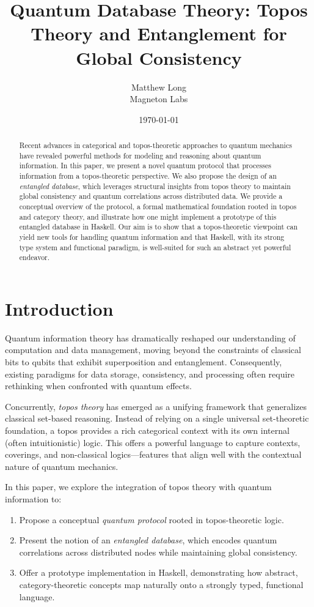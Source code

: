 \documentclass[11pt]{article}
\title{\textbf{Quantum Database Theory: Topos Theory and Entanglement for Global Consistency}}
\author{Matthew Long \\
Magneton Labs}
\date{\today}
\begin{document}
\maketitle

\begin{abstract}
Recent advances in categorical and topos-theoretic approaches to quantum mechanics have revealed powerful methods for modeling and reasoning about quantum information. In this paper, we present a novel quantum protocol that processes information from a topos-theoretic perspective. We also propose the design of an \emph{entangled database}, which leverages structural insights from topos theory to maintain global consistency and quantum correlations across distributed data. We provide a conceptual overview of the protocol, a formal mathematical foundation rooted in topos and category theory, and illustrate how one might implement a prototype of this entangled database in Haskell. Our aim is to show that a topos-theoretic viewpoint can yield new tools for handling quantum information and that Haskell, with its strong type system and functional paradigm, is well-suited for such an abstract yet powerful endeavor.
\end{abstract}

\tableofcontents

\newpage

\section{Introduction}
Quantum information theory has dramatically reshaped our understanding of computation and data management, moving beyond the constraints of classical bits to qubits that exhibit superposition and entanglement. Consequently, existing paradigms for data storage, consistency, and processing often require rethinking when confronted with quantum effects.

Concurrently, \emph{topos theory} has emerged as a unifying framework that generalizes classical set-based reasoning. Instead of relying on a single universal set-theoretic foundation, a topos provides a rich categorical context with its own internal (often intuitionistic) logic. This offers a powerful language to capture contexts, coverings, and non-classical logics—features that align well with the contextual nature of quantum mechanics.

In this paper, we explore the integration of topos theory with quantum information to:
\begin{enumerate}
    \item Propose a conceptual \emph{quantum protocol} rooted in topos-theoretic logic.
    \item Present the notion of an \emph{entangled database}, which encodes quantum correlations across distributed nodes while maintaining global consistency.
    \item Offer a prototype implementation in Haskell, demonstrating how abstract, category-theoretic concepts map naturally onto a strongly typed, functional language.
\end{enumerate}
\end{document}
